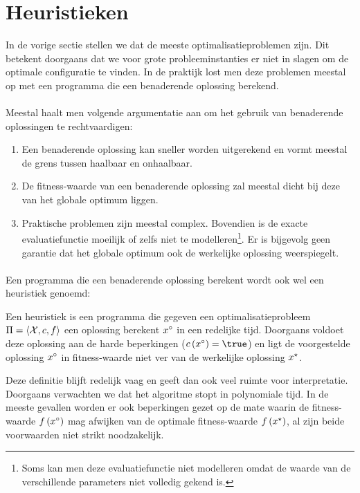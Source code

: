 \section{Heuristieken}

In de vorige sectie stellen we dat de meeste optimalisatieproblemen  zijn. Dit betekent doorgaans dat we voor grote probleeminstanties er niet in slagen om de optimale configuratie te vinden. In de praktijk lost men deze problemen meestal op met een programma die een benaderende oplossing berekend.

\paragraph{}
Meestal haalt men volgende argumentatie aan om het gebruik van benaderende oplossingen te rechtvaardigen:%
\begin{enumerate}
 \item Een benaderende oplossing kan sneller worden uitgerekend en vormt meestal de grens tussen haalbaar en onhaalbaar.
 \item De fitness-waarde van een benaderende oplossing zal meestal dicht bij deze van het globale optimum liggen.
 \item Praktische problemen zijn meestal complex. Bovendien is de exacte evaluatiefunctie moeilijk of zelfs niet te modelleren\footnote{Soms kan men deze evaluatiefunctie niet modelleren omdat de waarde van de verschillende parameters niet volledig gekend is.}. Er is bijgevolg geen garantie dat het globale optimum ook de werkelijke oplossing weerspiegelt.
\end{enumerate}

\paragraph{}
Een programma die een benaderende oplossing berekent wordt ook wel een heuristiek genoemd:

\begin{definition}[Heuristiek]
Een heuristiek is een programma die gegeven een optimalisatieprobleem $\Pi=\left\langle \mathcal{X},c,f\right\rangle$ een oplossing berekent $x^{\circ}$ in een redelijke tijd. Doorgaans voldoet deze oplossing aan de harde beperkingen ($\fun{\hcfun}{\goodSol}=\true$) en ligt de voorgestelde oplossing $x^{\circ}$ in fitness-waarde niet ver van de werkelijke oplossing $x^{\star}$.
\end{definition}

Deze definitie blijft redelijk vaag en geeft dan ook veel ruimte voor interpretatie. Doorgaans verwachten we dat het algoritme stopt in polynomiale tijd. In de meeste gevallen worden er ook beperkingen gezet op de mate waarin de fitness-waarde $f\left(x^{\circ}\right)$ mag afwijken van de optimale fitness-waarde $f\left(x^{\star}\right)$, al zijn beide voorwaarden niet strikt noodzakelijk.